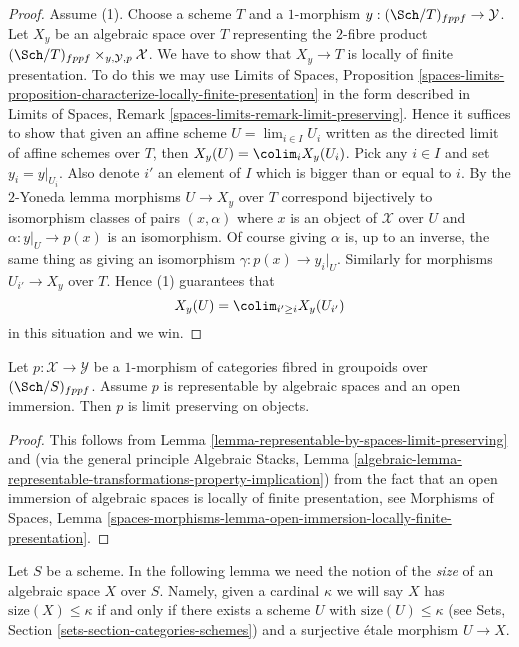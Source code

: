\begin{proof}
\medskip\noindent
Assume (1). Choose a scheme $T$ and a $1$-morphism
$y : (\Sch/T)_{fppf} \to \mathcal{Y}$. Let
$X_y$ be an algebraic space over $T$ representing the $2$-fibre product
$(\Sch/T)_{fppf} \times_{y, \mathcal{Y}, p} \mathcal{X}$.
We have to show that $X_y \to T$ is locally of finite presentation.
To do this we may use
Limits of Spaces, Proposition
\ref{spaces-limits-proposition-characterize-locally-finite-presentation}
in the form described in
Limits of Spaces,
Remark \ref{spaces-limits-remark-limit-preserving}.
Hence it suffices to show that given an affine scheme
$U = \lim_{i \in I} U_i$ written as the directed limit of affine schemes
over $T$, then $X_y(U) = \colim_i X_y(U_i)$.
Pick any $i \in I$ and set $y_i = y|_{U_i}$. Also denote $i'$ an element
of $I$ which is bigger than or equal to $i$. By the $2$-Yoneda lemma
morphisms $U \to X_y$ over $T$ correspond bijectively
to isomorphism classes of pairs $(x, \alpha)$ where $x$ is an object
of $\mathcal{X}$ over $U$ and $\alpha : y|_U \to p(x)$ is an isomorphism.
Of course giving $\alpha$ is, up to an inverse, the same thing as giving
an isomorphism $\gamma : p(x) \to y_i|_U$.
Similarly for morphisms $U_{i'} \to X_y$ over $T$. Hence (1) guarantees
that
$$
X_y(U) = \colim_{i' \geq i} X_y(U_{i'})
$$
in this situation and we win.
\end{proof}

\begin{lemma}
\label{lemma-open-immersion-limit-preserving}
Let $p : \mathcal{X} \to \mathcal{Y}$ be a $1$-morphism of categories
fibred in groupoids over $(\Sch/S)_{fppf}$. Assume $p$ is representable
by algebraic spaces and an open immersion. Then $p$ is limit preserving
on objects.
\end{lemma}

\begin{proof}
This follows from
Lemma \ref{lemma-representable-by-spaces-limit-preserving}
and (via the general principle
Algebraic Stacks, Lemma
\ref{algebraic-lemma-representable-transformations-property-implication})
from the fact that an open immersion of algebraic spaces is
locally of finite presentation, see
Morphisms of Spaces, Lemma
\ref{spaces-morphisms-lemma-open-immersion-locally-finite-presentation}.
\end{proof}

\noindent
Let $S$ be a scheme. In the following lemma we need the notion of the
{\it size} of an algebraic space $X$ over $S$. Namely, given a cardinal
$\kappa$ we will say $X$ has $\text{size}(X) \leq \kappa$ if and only
if there exists a scheme $U$ with $\text{size}(U) \leq \kappa$ (see
Sets, Section \ref{sets-section-categories-schemes}) and a surjective
\'etale morphism $U \to X$.

